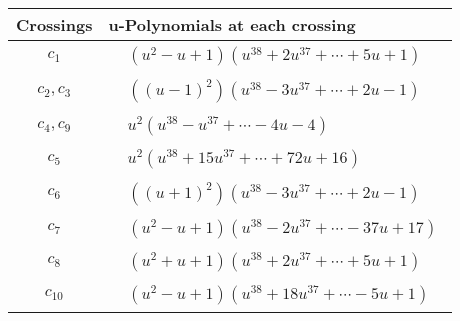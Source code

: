 \documentclass[1p]{elsarticle_modified}
\theoremstyle{definition}
\begin{document}
\begin{tabular}{m{50pt}|m{274pt}}
Crossings & \hspace{64pt}u-Polynomials at each crossing \\
\hline $$\begin{aligned}c_{1}\end{aligned}$$&$\begin{aligned}
&(u^2- u+1)(u^{38}+2 u^{37}+\cdots+5 u+1)
\end{aligned}$\\
\hline $$\begin{aligned}c_{2},c_{3}\end{aligned}$$&$\begin{aligned}
&((u-1)^2)(u^{38}-3 u^{37}+\cdots+2 u-1)
\end{aligned}$\\
\hline $$\begin{aligned}c_{4},c_{9}\end{aligned}$$&$\begin{aligned}
&u^2(u^{38}- u^{37}+\cdots-4 u-4)
\end{aligned}$\\
\hline $$\begin{aligned}c_{5}\end{aligned}$$&$\begin{aligned}
&u^2(u^{38}+15 u^{37}+\cdots+72 u+16)
\end{aligned}$\\
\hline $$\begin{aligned}c_{6}\end{aligned}$$&$\begin{aligned}
&((u+1)^2)(u^{38}-3 u^{37}+\cdots+2 u-1)
\end{aligned}$\\
\hline $$\begin{aligned}c_{7}\end{aligned}$$&$\begin{aligned}
&(u^2- u+1)(u^{38}-2 u^{37}+\cdots-37 u+17)
\end{aligned}$\\
\hline $$\begin{aligned}c_{8}\end{aligned}$$&$\begin{aligned}
&(u^2+u+1)(u^{38}+2 u^{37}+\cdots+5 u+1)
\end{aligned}$\\
\hline $$\begin{aligned}c_{10}\end{aligned}$$&$\begin{aligned}
&(u^2- u+1)(u^{38}+18 u^{37}+\cdots-5 u+1)
\end{aligned}$\\
\hline
\end{tabular}\newpage\renewcommand{\arraystretch}{1}
\end{document}
